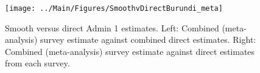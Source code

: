 \documentclass[12pt]{article}\usepackage[]{graphicx}\usepackage[]{color}
\newenvironment{knitrout}{}{} %
\begin{document}



\begin{knitrout}
\color{fgcolor}\begin{figure}[bht]

{\centering \texttt{[image: ../Main/Figures/SmoothvDirectBurundi\_meta]} 

}

\caption[Smooth versus direct Admin 1 estimates]{Smooth versus direct Admin 1 estimates. Left: Combined (meta-analysis) survey estimate against combined direct estimates. Right: Combined (meta-analysis) survey estimate against direct estimates from each survey.}\label{fig:unnamed-chunk-33}
\end{figure}


\end{knitrout}
\end{document}
